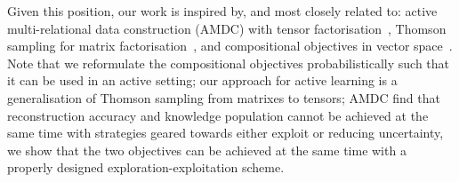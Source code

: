 Given this position, our work is inspired by, and most closely related to:
active multi-relational data construction (AMDC) 
with tensor factorisation~\cite{kajino2015active}, 
Thomson sampling for matrix factorisation~\cite{kawale2015efficient}, 
and compositional objectives in vector space~\cite{guu2015traversing}.
Note that we reformulate the compositional objectives probabilistically such that it can be used in an active setting; 
our approach for active learning is a generalisation of
Thomson sampling from matrixes to tensors; 
AMDC find that reconstruction accuracy and knowledge population 
cannot be achieved at the same time with strategies geared towards 
either exploit or reducing uncertainty, 
we show that the two objectives can be achieved at the same time with 
a properly designed exploration-exploitation scheme. 



%


